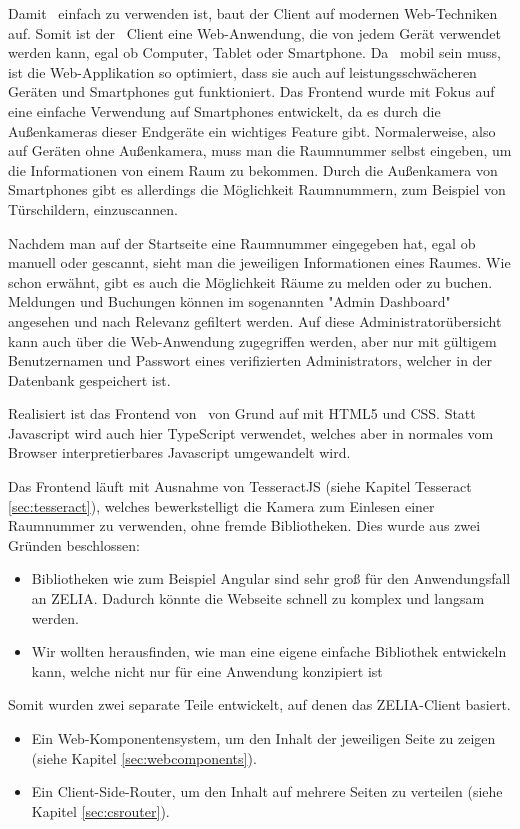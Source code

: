 
Damit \ZELIA\ einfach zu verwenden ist, baut der Client auf modernen Web-Techniken auf. Somit ist der \ZELIA\ Client eine Web-Anwendung,  die von jedem Gerät verwendet werden kann, egal ob Computer, Tablet oder Smartphone. Da \ZELIA\ mobil sein muss, ist die Web-Applikation so optimiert, dass sie auch auf leistungsschwächeren Geräten und Smartphones gut funktioniert. Das Frontend wurde mit Fokus auf eine einfache Verwendung auf Smartphones entwickelt, da es durch die Außenkameras dieser Endgeräte ein wichtiges Feature gibt. Normalerweise, also auf Geräten ohne Außenkamera, muss man die Raumnummer selbst eingeben, um die Informationen von einem Raum zu bekommen. Durch die Außenkamera von Smartphones gibt es allerdings die Möglichkeit Raumnummern, zum Beispiel von Türschildern, einzuscannen. 

Nachdem man auf der Startseite eine Raumnummer eingegeben hat, egal ob manuell oder gescannt, sieht man die jeweiligen Informationen eines Raumes. Wie schon erwähnt, gibt es auch die Möglichkeit Räume zu melden oder zu buchen. Meldungen und Buchungen können im sogenannten "Admin Dashboard" angesehen und nach Relevanz gefiltert werden. Auf diese Administratorübersicht kann auch über die Web-Anwendung zugegriffen werden, aber nur mit gültigem Benutzernamen und Passwort eines verifizierten Administrators, welcher in der Datenbank gespeichert ist.

Realisiert ist das Frontend von \ZELIA\ von Grund auf mit HTML5 und CSS. Statt Javascript wird auch hier TypeScript verwendet, welches aber in normales vom Browser interpretierbares Javascript umgewandelt wird. 

Das Frontend läuft mit Ausnahme von TesseractJS (siehe Kapitel Tesseract \ref{sec:tesseract}), welches bewerkstelligt die Kamera zum Einlesen einer Raumnummer zu verwenden, ohne fremde Bibliotheken. Dies wurde aus zwei Gründen beschlossen:
\begin{itemize}
    \item Bibliotheken wie zum Beispiel Angular sind sehr groß für den Anwendungsfall an ZELIA. Dadurch könnte die Webseite schnell zu komplex und langsam werden.
    \item Wir wollten herausfinden, wie man eine eigene einfache Bibliothek entwickeln kann, welche nicht nur für eine Anwendung konzipiert ist
\end{itemize}

Somit wurden zwei separate Teile entwickelt, auf denen das ZELIA-Client basiert. 
\begin{itemize}
    \item Ein Web-Komponentensystem, um den Inhalt der jeweiligen Seite zu zeigen (siehe Kapitel \ref{sec:webcomponents}).
    \item Ein Client-Side-Router, um den Inhalt auf mehrere Seiten zu verteilen (siehe Kapitel \ref{sec:csrouter}).
\end{itemize}
